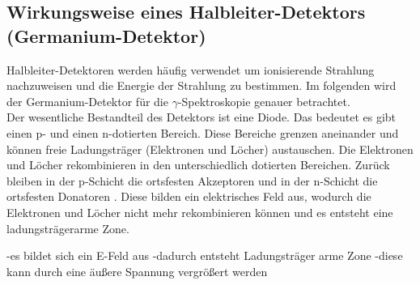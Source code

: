 \newpage
\subsection{Wirkungsweise eines Halbleiter-Detektors (Germanium-Detektor)}
Halbleiter-Detektoren werden häufig verwendet um ionisierende Strahlung nachzuweisen und die Energie der Strahlung zu bestimmen. Im folgenden wird der Germanium-Detektor für die $\gamma$-Spektroskopie genauer betrachtet. \\
Der wesentliche Bestandteil des Detektors ist eine Diode. Das bedeutet es gibt einen p- und einen n-dotierten Bereich. Diese Bereiche grenzen aneinander und können freie  Ladungsträger (Elektronen und Löcher) austauschen. Die Elektronen und Löcher rekombinieren in den unterschiedlich dotierten Bereichen. Zurück bleiben in der p-Schicht die ortsfesten Akzeptoren und in der n-Schicht die ortsfesten Donatoren \cite[10]{V18}. Diese bilden ein elektrisches Feld aus, wodurch die Elektronen und Löcher nicht mehr rekombinieren können und es entsteht eine ladungsträgerarme Zone. 



-es bildet sich ein E-Feld aus
-dadurch entsteht Ladungsträger arme Zone
-diese kann durch eine äußere Spannung vergrößert werden

